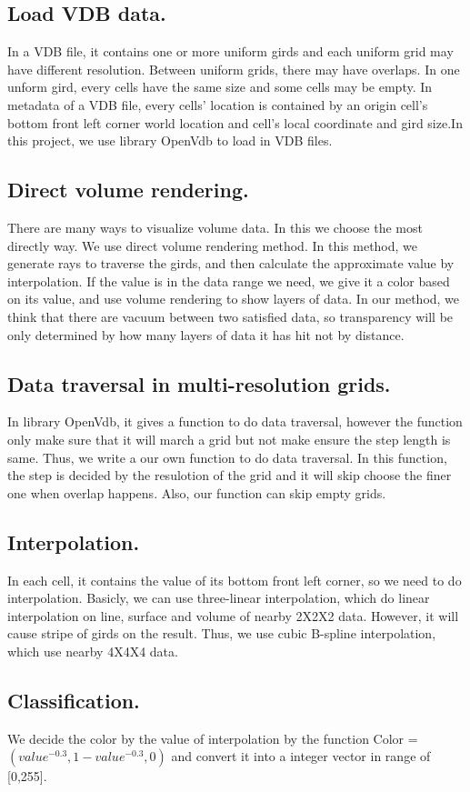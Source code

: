 \documentclass[acmtog]{acmart}
\begin{document}
	\subsection{Load VDB data.}
	In a VDB file, it contains one or more uniform girds and each uniform grid may have different resolution. Between uniform grids, there may have overlaps. In one unform gird, every cells have the same size and some cells may be empty. In metadata of a VDB file, every cells' location is contained by an origin cell's bottom front left corner world location and cell's local coordinate and gird size.In this project, we use library OpenVdb to load in VDB files.
	\subsection{Direct volume rendering.}
	There are many ways to visualize volume data. In this we choose the most directly way. We use direct volume rendering method. In this method, we generate rays to traverse the girds, and then calculate the approximate value by interpolation. If the value is in the data range we need, we give it a color based on its value, and use volume rendering to show layers of data. In our method, we think that there are vacuum between two satisfied data, so transparency will be only determined by how many layers of data it has hit not by distance.    
	\subsection{Data traversal in multi-resolution grids.}
	In library OpenVdb, it gives a function to do data traversal, however the function only make sure that it will march a grid but not make ensure the step length is same. Thus, we write a our own function to do data traversal. In this function, the step is decided by the resulotion of the grid and it will skip choose the finer one when overlap happens. Also, our function can skip empty grids.
	\subsection{Interpolation.}
	In each cell, it contains the value of its bottom front left corner, so we need to do interpolation.
	Basicly, we can use three-linear interpolation, which do linear interpolation on line, surface and volume of nearby 2X2X2 data. However, it will cause stripe of girds on the result. Thus, we use
	cubic B-spline interpolation, which use nearby 4X4X4 data.
	\subsection{Classification.}
	We decide the color by the value of interpolation by the function Color = $ (value^{-0.3},1-value^{-0.3},0) $ and convert it into a integer vector in range of [0,255].
\end{document}
